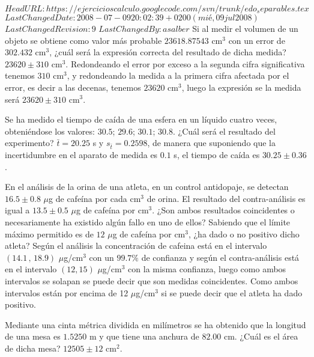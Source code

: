 \svnidlong
{$HeadURL: https://ejercicioscalculo.googlecode.com/svn/trunk/edo_separables.tex $}
{$LastChangedDate: 2008-07-09 20:02:39 +0200 (mié, 09 jul 2008) $}
{$LastChangedRevision: 9 $}
{$LastChangedBy: asalber $}
%
{Si al medir el volumen de un objeto se obtiene como valor más probable $23618.87543$ cm$^3$ con un error de $302.432$
cm$^3$, ¿cuál será la expresión correcta del resultado de dicha medida?     
}
{$23620\pm310$ cm$^3$.
}
{Redondeando el error por exceso a la segunda cifra significativa tenemos $310$ cm$^3$, y redondeando la medida a la
primera cifra afectada por el error, es decir a las decenas, tenemos $23620$ cm$^3$, luego la expresión se la medida
será $23620\pm310$ cm$^3$.}


{Se ha medido el tiempo de caída de una esfera en un líquido cuatro veces, obteniéndose los valores: $30.5$; $29.6$;
$30.1$; $30.8$. ¿Cuál será el resultado del experimento?}
{$\bar t=20.25$ s y $s_{\bar t}=0.2598$, de manera que suponiendo que la incertidumbre en el aparato de medida es
$0.1$ s, el tiempo de caída es $30.25\pm0.36$.
}
{}


{En el análisis de la orina de una atleta, en un control antidopaje, se detectan $16.5 \pm 0.8$ $\mu$g de cafeína por
cada cm$^3$ de orina. El resultado del contra-análisis es igual a $13.5 \pm 0.5$ $\mu$g de cafeína por cm$^3$. ¿Son
ambos resultados coincidentes o necesariamente ha existido algún fallo en uno de ellos? Sabiendo que el límite máximo
permitido es de $12$ $\mu$g de cafeína por cm$^3$, ¿ha dado o no positivo dicho atleta?
}
{Según el análisis la concentración de cafeina está en el intervalo $(14.1\,,\,18.9)$ $\mu$g/cm$^3$ con un $99.7\%$ de
confianza y según el contra-análisis está en el intervalo $(12,15)$ $\mu$g/cm$^3$ con la misma confianza, luego como
ambos intervalos se solapan se puede decir que son medidas coincidentes. Como ambos intervalos están por encima de 12
$\mu$g/cm$^3$ si se puede decir que el atleta ha dado positivo.
}
{}


{Mediante una cinta métrica dividida en milímetros se ha obtenido que la longitud de una mesa es $1.5250$ m y que tiene
una anchura de $82.00$ cm. ¿Cuál es el área de dicha mesa?
}
{$12505\pm12$ cm$^2$.
}
{}


